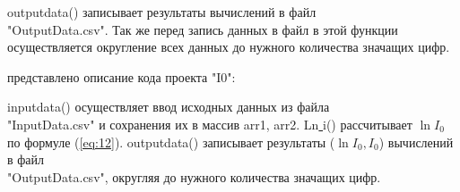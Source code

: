  outputdata() записывает результаты вычислений в файл \\"OutputData.csv". Так же перед запись данных в файл в этой функции осуществляется округление всех данных до нужного количества значащих цифр.
\begin{center} представлено описание кода проекта "I0":\end{center}
 inputdata() осуществляет ввод исходных данных из файла \\"InputData.csv"
и сохранения их в массив arr1, arr2.
 Ln\underline{ }i() рассчитывает $\ln I_0$ по формуле (\ref{eq:12}).
 outputdata() записывает результаты ($\ln I_0, I_0$) вычислений в файл \\"OutputData.csv"\verb||, округляя до нужного количества значащих цифр.
\vspace{3mm}

